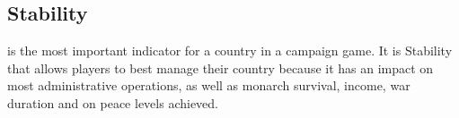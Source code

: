 





\subsection{Stability}


\STAB is the most important indicator for a country in a campaign game. It is
Stability that allows players to best manage their country because it has an
impact on most administrative operations, as well as monarch survival, income,
war duration and on peace levels achieved.

